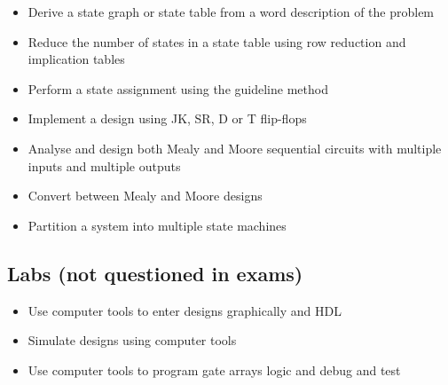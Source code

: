 \begin{itemize}
  \item Derive a state graph or state table from a word description of the problem
  \item Reduce the number of states in a state table using row reduction and implication tables
  \item Perform a state assignment using the guideline method
  \item Implement a design using JK, SR, D or T flip-flops
  \item Analyse and design both Mealy and Moore sequential circuits with multiple inputs and multiple outputs
  \item Convert between Mealy and Moore designs
  \item Partition a system into multiple state machines
\end{itemize}

\subsection{Labs (not questioned in exams)}
\begin{itemize}
  \item Use computer tools to enter designs graphically and HDL
  \item Simulate designs using computer tools
  \item Use computer tools to program gate arrays logic and debug and test
\end{itemize}

\newpage
